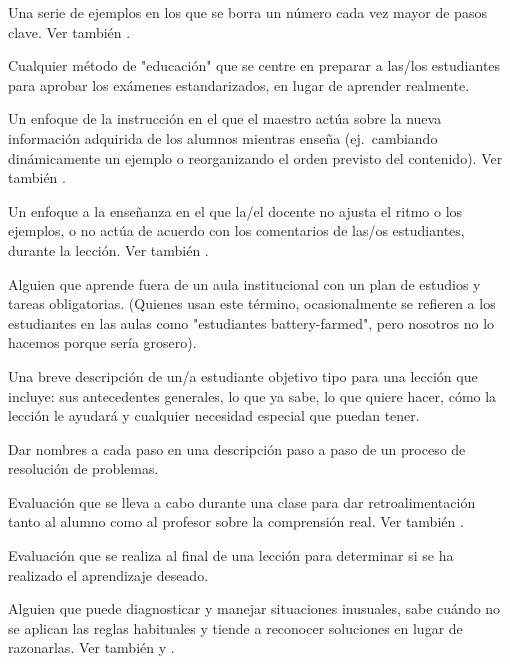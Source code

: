 \begin{description}
 Una serie de ejemplos en los que 
se borra un número cada vez mayor de pasos clave. Ver
también .

 Cualquier método de "educación" 
que se centre en preparar a las/los estudiantes para aprobar los exámenes estandarizados, en lugar de aprender realmente.

 Un enfoque de la instrucción en el que el
maestro actúa sobre la nueva información adquirida de los alumnos mientras enseña (ej.\ cambiando
dinámicamente un ejemplo o reorganizando el orden previsto del contenido).
Ver también .

 Un enfoque a la enseñanza en el que la/el docente no ajusta el ritmo o los ejemplos, o no actúa de acuerdo con los comentarios de las/os estudiantes, durante la lección.  Ver también .

 Alguien que aprende fuera de un aula institucional con un plan de estudios y tareas obligatorias. (Quienes usan este término, ocasionalmente se refieren a los estudiantes en las aulas como "estudiantes battery-farmed", pero nosotros no lo hacemos porque sería grosero).

 Una breve descripción de un/a estudiante objetivo tipo para una lección que incluye: sus antecedentes generales, lo que ya sabe, lo que quiere hacer, cómo la lección le ayudará y cualquier necesidad especial que puedan tener.

 Dar nombres a cada paso en una descripción paso a paso de un proceso de resolución de problemas.

 Evaluación que se lleva a cabo 
durante una clase para dar retroalimentación tanto al alumno como al profesor 
sobre la comprensión real. Ver también .

 Evaluación que se realiza al final de una lección para determinar si se ha realizado el aprendizaje deseado.

 Alguien que puede diagnosticar y manejar situaciones inusuales,  sabe cuándo no se aplican las reglas habituales y tiende a reconocer soluciones en lugar de razonarlas. 
Ver también 
y .


\end{description}
